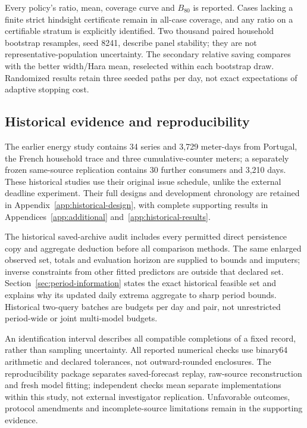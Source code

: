 \documentclass[12pt]{article}
\begin{document}
Every policy's ratio, mean, coverage curve and $B_{80}$ is reported.
Cases lacking a finite strict hindsight certificate remain in all-case
coverage, and any ratio on a certifiable stratum is explicitly identified.
Two thousand paired household bootstrap resamples, seed 8241, describe
panel stability; they are not representative-population uncertainty.
The secondary relative saving compares with the better width/Hara mean,
reselected within each bootstrap draw. Randomized results retain three
seeded paths per day, not exact expectations of adaptive stopping cost.

\subsection{Historical evidence and reproducibility}
The earlier energy study contains 34 series and 3,729 meter-days from Portugal,
the French household trace and three cumulative-counter meters; a separately
frozen same-source replication contains 30 further consumers and 3,210 days.
These historical studies use their original issue schedule, unlike the
external deadline experiment. Their full designs and development chronology
are retained in Appendix~\ref{app:historical-design}, with complete supporting
results in Appendices~\ref{app:additional} and~\ref{app:historical-results}.

The historical saved-archive audit includes every permitted direct
persistence copy and aggregate deduction before all comparison methods.
The same enlarged observed set, totals and evaluation horizon are supplied
to bounds and imputers; inverse constraints from other fitted predictors
are outside that declared set. Section~\ref{sec:period-information} states
the exact historical feasible set and explains why its updated daily extrema
aggregate to sharp period bounds. Historical two-query batches are budgets
per day and pair, not unrestricted period-wide or joint multi-model budgets.

An identification interval describes all compatible completions of a fixed
record, rather than sampling uncertainty. All reported numerical checks use
binary64 arithmetic and declared tolerances, not outward-rounded enclosures.
The reproducibility package separates saved-forecast replay, raw-source
reconstruction and fresh model fitting; independent checks mean separate
implementations within this study, not external investigator replication.
Unfavorable outcomes, protocol amendments and incomplete-source limitations
remain in the supporting evidence.
\end{document}
